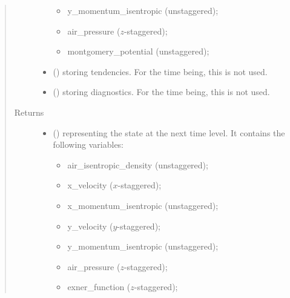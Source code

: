 \documentclass[letterpaper,10pt,english]{sphinxmanual}
\begin{document}
\begin{fulllineitems}
\begin{fulllineitems}
\begin{quote}
\begin{description}
\begin{itemize}
\begin{itemize}
\item {} 
y\_momentum\_isentropic (unstaggered);

\item {} 
air\_pressure (\(z\)-staggered);

\item {} 
montgomery\_potential (unstaggered);

\end{itemize}


\item {} 
 () \textendash{} {\hyperref[\detokenize{api:storages.grid_data.GridData}]{}} storing tendencies.
For the time being, this is not used.

\item {} 
 () \textendash{} {\hyperref[\detokenize{api:storages.grid_data.GridData}]{}} storing diagnostics.
For the time being, this is not used.

\end{itemize}

\item[{Returns}] \leavevmode
\begin{itemize}
\item {} 
 () \textendash{} {\hyperref[\detokenize{api:storages.state_isentropic.StateIsentropic}]{}} representing the state at the next time level.
It contains the following variables:
\begin{itemize}
\item {} 
air\_isentropic\_density (unstaggered);

\item {} 
x\_velocity (\(x\)-staggered);

\item {} 
x\_momentum\_isentropic (unstaggered);

\item {} 
y\_velocity (\(y\)-staggered);

\item {} 
y\_momentum\_isentropic (unstaggered);

\item {} 
air\_pressure (\(z\)-staggered);

\item {} 
exner\_function (\(z\)-staggered);


\end{itemize}
\end{itemize}
\end{description}
\end{quote}
\end{fulllineitems}
\end{fulllineitems}
\end{document}
